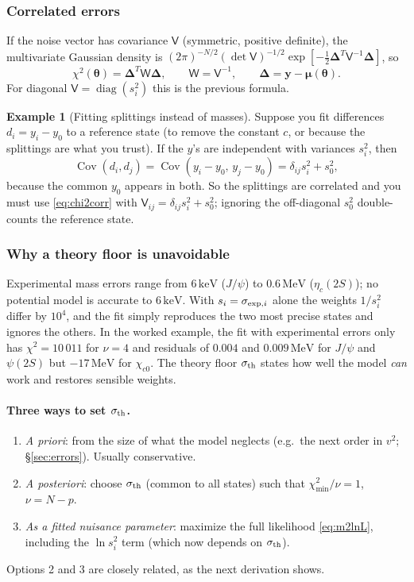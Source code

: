 \documentclass[11pt,a4paper]{article}
\numberwithin{equation}{section}
\theoremstyle{definition}
\newtheorem{example}[definition]{Example}
\theoremstyle{plain}
\theoremstyle{remark}
\numberwithin{algorithm}{section}
\newcommand{\diag}{\operatorname{diag}}
\newcommand{\MeV}{\,\mathrm{MeV}}
\newcommand{\keV}{\,\mathrm{keV}}
\newcommand{\sW}{\mathsf W}
\newcommand{\sV}{\mathsf V}
\newcommand{\vth}{\bm\theta}
\newcommand{\vD}{\bm\Delta}
\begin{document}
\subsubsection{Correlated errors}
If the noise vector has covariance $\sV$ (symmetric, positive definite), the multivariate Gaussian density is $(2\pi)^{-N/2}(\det\sV)^{-1/2}\exp[-\frac12\vD^T\sV^{-1}\vD]$, so
\begin{equation}
\chi^2(\vth)=\vD^T\sW\vD,\qquad \sW=\sV^{-1},\qquad \vD=\bm y-\bm\mu(\vth).
\label{eq:chi2corr}
\end{equation}
For diagonal $\sV=\diag(s_i^2)$ this is the previous formula.

\begin{example}[Fitting splittings instead of masses]
Suppose you fit differences $d_i=y_i-y_0$ to a reference state (to remove the constant $c$, or because the splittings are what you trust). If the $y$'s are independent with variances $s_i^2$, then
\[
\operatorname{Cov}(d_i,d_j)=\operatorname{Cov}(y_i-y_0,\,y_j-y_0)=\delta_{ij}s_i^2+s_0^2 ,
\]
because the common $y_0$ appears in both. So the splittings are correlated and you must use \eqref{eq:chi2corr} with $\sV_{ij}=\delta_{ij}s_i^2+s_0^2$; ignoring the off-diagonal $s_0^2$ double-counts the reference state.
\end{example}

\subsubsection{Why a theory floor is unavoidable}
Experimental mass errors range from $6\keV$ ($J/\psi$) to $0.6\MeV$ ($\eta_c(2S)$); no potential model is accurate to $6\keV$. With $s_i=\sigma_{{\rm exp},i}$ alone the weights $1/s_i^2$ differ by $10^4$, and the fit simply reproduces the two most precise states and ignores the others. In the worked example, the fit with experimental errors only has $\chi^2=10\,011$ for $\nu=4$ and residuals of $0.004$ and $0.009\MeV$ for $J/\psi$ and $\psi(2S)$ but $-17\MeV$ for $\chi_{c0}$. The theory floor $\sigma_{\rm th}$ states how well the model \emph{can} work and restores sensible weights.

\paragraph{Three ways to set $\sigma_{\rm th}$.}
\begin{enumerate}[leftmargin=1.5em,itemsep=2pt]
\item \emph{A priori}: from the size of what the model neglects (e.g.\ the next order in $v^2$; \S\ref{sec:errors}). Usually conservative.
\item \emph{A posteriori}: choose $\sigma_{\rm th}$ (common to all states) such that $\chi^2_{\min}/\nu=1$, $\nu=N-p$.
\item \emph{As a fitted nuisance parameter}: maximize the full likelihood \eqref{eq:m2lnL}, including the $\ln s_i^2$ term (which now depends on $\sigma_{\rm th}$).
\end{enumerate}
Options 2 and 3 are closely related, as the next derivation shows.
\end{document}
